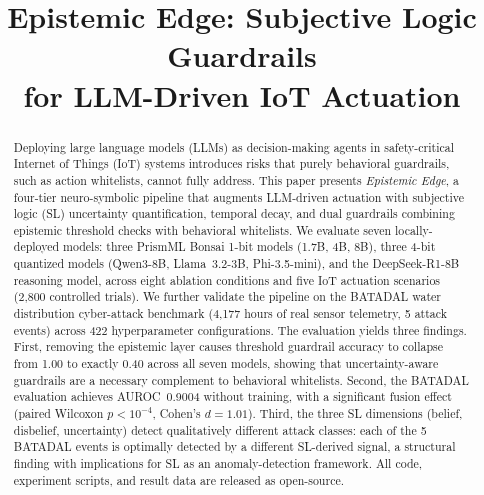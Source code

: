 \documentclass[conference]{IEEEtran}
\begin{document}
\title{Epistemic Edge: Subjective Logic Guardrails\\for LLM-Driven IoT Actuation}

\author{
\and
{}
}

\maketitle

\begin{abstract}
Deploying large language models (LLMs) as decision-making agents in safety-critical Internet of Things (IoT) systems introduces risks that purely behavioral guardrails, such as action whitelists, cannot fully address.
This paper presents \textit{Epistemic Edge}, a four-tier neuro-symbolic pipeline that augments LLM-driven actuation with subjective logic (SL) uncertainty quantification, temporal decay, and dual guardrails combining epistemic threshold checks with behavioral whitelists.
We evaluate seven locally-deployed models: three PrismML Bonsai 1-bit models (1.7B, 4B, 8B), three 4-bit quantized models (Qwen3-8B, Llama~3.2-3B, Phi-3.5-mini), and the DeepSeek-R1-8B reasoning model, across eight ablation conditions and five IoT actuation scenarios (2{,}800 controlled trials).
We further validate the pipeline on the BATADAL water distribution cyber-attack benchmark (4{,}177 hours of real sensor telemetry, 5 attack events) across 422 hyperparameter configurations.
The evaluation yields three findings.
First, removing the epistemic layer causes threshold guardrail accuracy to collapse from 1.00 to exactly 0.40 across all seven models, showing that uncertainty-aware guardrails are a necessary complement to behavioral whitelists.
Second, the BATADAL evaluation achieves AUROC~0.9004 without training, with a significant fusion effect (paired Wilcoxon $p<10^{-4}$, Cohen's $d{=}1.01$).
Third, the three SL dimensions (belief, disbelief, uncertainty) detect qualitatively different attack classes: each of the 5 BATADAL events is optimally detected by a different SL-derived signal, a structural finding with implications for SL as an anomaly-detection framework.
All code, experiment scripts, and result data are released as open-source.
\end{abstract}
\end{document}
